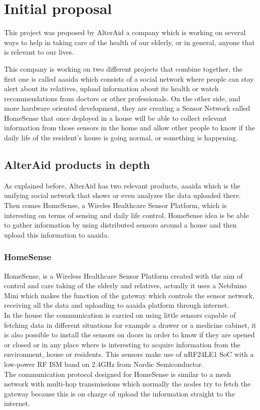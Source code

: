 \chapter{Initial proposal}\label{C:innitial-proposal}
This project was proposed by AlterAid a company which is working on several ways to help in taking care of the health of our elderly, or in general, anyone that is relevant to our lives.

This company is working on two different projects that combine together, the first one is called aaaida which consists of a social network where people can stay alert about its relatives, upload information about its health or watch recommendations from doctors or other professionals. On the other side, and more hardware oriented development, they are creating a Sensor Network called HomeSense that once deployed in a house will be able to collect relevant information from those sensors in the home and allow other people to know if the daily life of the resident's house is going normal, or something is happening.

\section{AlterAid products in depth}\label{S:alteraid-products}
As explained before, AlterAid has two relevant products, aaaida which is the unifying social network that shows or even analyzes the data uploaded there. Then comes HomeSense, a Wireles Healthcare Sensor Platform, which is interesting on terms of sensing and daily life control. HomeSense idea is be able to gather information by using distributed sensors around a house and then upload this information to aaaida.

\subsection{HomeSense}\label{SS:HomeSense-proposal}
HomeSense, is a Wireless Healthcare Sensor Platform created with the aim of control and care taking of the elderly and relatives, actually it uses a Netduino Mini which makes the function of the gateway which controls the sensor network, receiving all the data and uploading to aaaida platform through internet.
\\
In the house the communication is carried on using little sensors capable of fetching data in different situations for example a drawer or a medicine cabinet, it is also possible to install the sensors on doors in order to know if they are opened or closed or in any place where is interesting to acquire information from the environment, house or residents. This sensors make use of nRF24LE1 \gls{SoC} with a low-power RF \gls{ISM} band on 2.4GHz from Nordic Semiconductor.
\\
The communication protocol designed for HomeSense is similar to a mesh network with multi-hop transmissions which normally the nodes try to fetch the gateway because this is on charge of upload the information straight to the internet.

